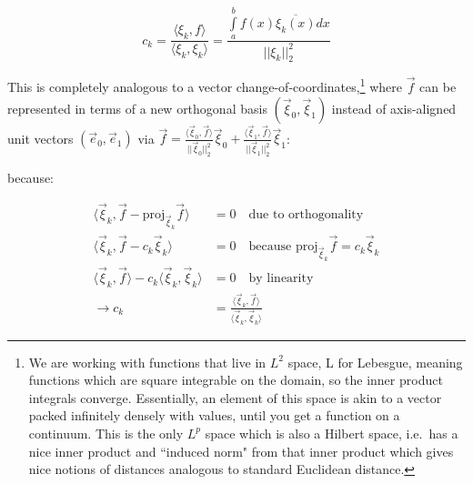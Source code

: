 \documentclass[10pt]{article}
\begin{document}
\begin{equation}\label{spectralcoefs}
c_k = \frac{\langle \xi_k,f \rangle}{\langle \xi_k,\xi_k \rangle} = \frac{\int\limits_{a}^{b} f(x) \overline{\xi_k(x)} dx}{||\xi_k||_2^2}
\end{equation}

This is completely analogous to a vector change-of-coordinates,\footnote{We are working with functions that live in $L^2$ space, L for Lebesgue, meaning functions which are square integrable on the domain, so the inner product integrals converge. Essentially, an element of this space is akin to a vector packed infinitely densely with values, until you get a function on a continuum. This is the only $L^p$ space which is also a Hilbert space, i.e.~has a nice inner product and ``induced norm" from that inner product which gives nice notions of distances analogous to standard Euclidean distance.} where $\vec{f}$ can be represented in terms of a new orthogonal basis $(\vec{\xi}_0, \vec{\xi}_1)$ instead of axis-aligned unit vectors $(\vec{e}_0,\vec{e}_1)$ via $\vec{f} = \frac{\langle \vec{\xi}_0,\vec{f}\rangle}{||\vec{\xi}_0||_2^2} \vec{\xi}_0 + \frac{\langle \vec{\xi}_1,\vec{f}\rangle}{||\vec{\xi}_1||_2^2} \vec{\xi}_1$:

\begin{center}
\end{center}

\noindent because:

\begin{align*}
\langle \vec{\xi}_k, \vec{f} - \mathrm{proj}_{\vec{\xi}_k} \vec{f} \rangle &= 0\quad\text{due to orthogonality}\\
\langle \vec{\xi}_k, \vec{f} - c_k\vec{\xi}_k \rangle &= 0\quad\text{because proj}_{\vec{\xi}_k}\vec{f} = c_k\vec{\xi}_k\\
\langle \vec{\xi}_k, \vec{f} \rangle - c_k \langle \vec{\xi}_k, \vec{\xi}_k \rangle &= 0\quad\text{by linearity}\\
\rightarrow c_k &= \frac{\langle \vec{\xi}_k, \vec{f} \rangle}{\langle \vec{\xi}_k, \vec{\xi}_k \rangle}
\end{align*}
\end{document}
